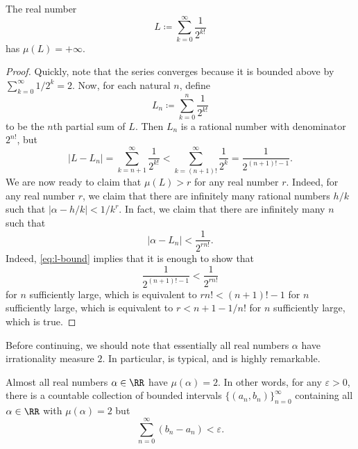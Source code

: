 \documentclass[../notes.tex]{subfiles}
\begin{document}
\begin{example}[Liouville] \label{ex:liouville-number}
	The real number
	\[L\coloneqq\sum_{k=0}^\infty\frac1{2^{k!}}\]
	has $\mu(L)=+\infty$.
\end{example}
\begin{proof}
	Quickly, note that the series converges because it is bounded above by $\sum_{k=0}^\infty1/2^k=2$. Now, for each natural $n$, define
	\[L_n\coloneqq\sum_{k=0}^n\frac1{2^{k!}}\]
	to be the $n$th partial sum of $L$. Then $L_n$ is a rational number with denominator $2^{n!}$, but
	\begin{equation}
		\left|L-L_n\right|=\sum_{k=n+1}^\infty\frac1{2^{k!}}<\sum_{k=(n+1)!}^\infty\frac1{2^k}=\frac1{2^{(n+1)!-1}}. \label{eq:l-bound}
	\end{equation}
	We are now ready to claim that $\mu(L)>r$ for any real number $r$. Indeed, for any real number $r$, we claim that there are infinitely many rational numbers $h/k$ such that $\left|\alpha-h/k\right|<1/k^r$. In fact, we claim that there are infinitely many $n$ such that
	\[\left|\alpha-L_n\right|<\frac1{2^{rn!}}.\]
	Indeed, \eqref{eq:l-bound} implies that it is enough to show that
	\[\frac1{2^{(n+1)!-1}}<\frac1{2^{rn!}}\]
	for $n$ sufficiently large, which is equivalent to $rn!<(n+1)!-1$ for $n$ sufficiently large, which is equivalent to $r<n+1-1/n!$ for $n$ sufficiently large, which is true.
\end{proof}
Before continuing, we should note that essentially all real numbers $\alpha$ have irrationality measure $2$. In particular,  is typical, and  is highly remarkable.
\begin{proposition} \label{prop:almost-all-mu-two}
	Almost all real numbers $\alpha\in\RR$ have $\mu(\alpha)=2$. In other words, for any $\varepsilon>0$, there is a countable collection of bounded intervals $\{(a_n,b_n)\}_{n=0}^\infty$ containing all $\alpha\in\RR$ with $\mu(\alpha)=2$ but
	\[\sum_{n=0}^\infty(b_n-a_n)<\varepsilon.\]
\end{proposition}
\end{document}
